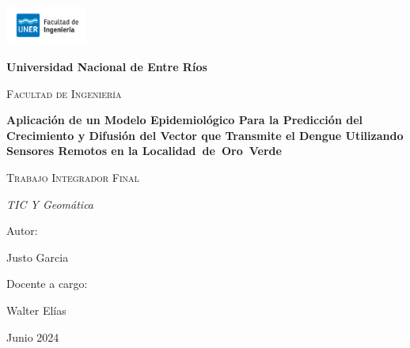 \begin{titlepage}
    \centering
    {\includegraphics[width=0.2\textwidth]{Images/fiuner.png}\par}
    \vspace{0.01cm}
    {\bfseries\LARGE Universidad Nacional de Entre Ríos \par}
    \vspace{0.2cm}
    {\scshape\Large Facultad de Ingeniería \par}
    \vspace{1cm}
    {\bfseries\Huge Aplicación de un Modelo Epidemiológico Para la Predicción del Crecimiento y Difusión del Vector que Transmite el Dengue Utilizando Sensores Remotos en la Localidad de Oro Verde \par}
    \vspace{2cm}
    {\scshape\Large Trabajo Integrador Final\par}
    {\itshape\Large TIC Y Geomática \par}
    \vfill
    { Autor: \par}
    {Justo Garcia \par}
    {Docente a cargo: \par}
    {Walter Elías \par}
    \vfill
    {\Large Junio 2024 \par}
\end{titlepage}
